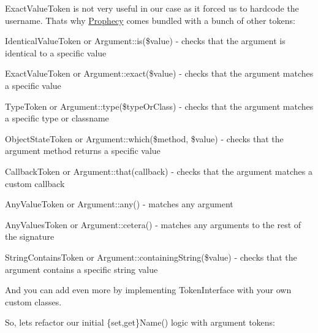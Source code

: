 

{\ttfamily Exact\+Value\+Token} is not very useful in our case as it forced us to hardcode the username. That\textquotesingle{}s why \mbox{\hyperlink{namespace_prophecy}{Prophecy}} comes bundled with a bunch of other tokens\+:


\begin{DoxyItemize}
\item {\ttfamily Identical\+Value\+Token} or {\ttfamily Argument\+::is(\$value)} -\/ checks that the argument is identical to a specific value
\item {\ttfamily Exact\+Value\+Token} or {\ttfamily Argument\+::exact(\$value)} -\/ checks that the argument matches a specific value
\item {\ttfamily Type\+Token} or {\ttfamily Argument\+::type(\$type\+Or\+Class)} -\/ checks that the argument matches a specific type or classname
\item {\ttfamily Object\+State\+Token} or {\ttfamily Argument\+::which(\$method, \$value)} -\/ checks that the argument method returns a specific value
\item {\ttfamily Callback\+Token} or {\ttfamily Argument\+::that(callback)} -\/ checks that the argument matches a custom callback
\item {\ttfamily Any\+Value\+Token} or {\ttfamily Argument\+::any()} -\/ matches any argument
\item {\ttfamily Any\+Values\+Token} or {\ttfamily Argument\+::cetera()} -\/ matches any arguments to the rest of the signature
\item {\ttfamily String\+Contains\+Token} or {\ttfamily Argument\+::containing\+String(\$value)} -\/ checks that the argument contains a specific string value
\end{DoxyItemize}

And you can add even more by implementing {\ttfamily Token\+Interface} with your own custom classes.

So, let\textquotesingle{}s refactor our initial {\ttfamily \{set,get\}Name()} logic with argument tokens\+:


